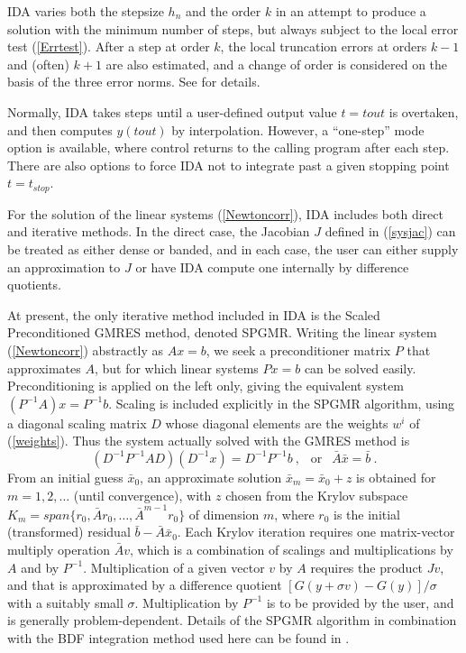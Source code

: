 \documentclass[11pt]{article}
\begin{document}
IDA varies both the stepsize $h_n$ and the order $k$ in an attempt to
produce a solution with the minimum number of steps, but always
subject to the local error test (\ref{Errtest}).  After a step at
order $k$, the local truncation errors at orders $k-1$ and (often)
$k+1$ are also estimated, and a change of order is considered on the
basis of the three error norms.  See \cite{BrCaPe96} for details.  

Normally, IDA takes steps until a user-defined output value $t = tout$
is overtaken, and then computes $y(tout)$ by interpolation.  However,
a ``one-step'' mode option is available, where control returns to the
calling program after each step.  There are also options to force IDA
not to integrate past a given stopping point $t = t_{stop}$.

For the solution of the linear systems (\ref{Newtoncorr}), IDA includes
both direct and iterative methods.  In the direct case, the Jacobian
$J$ defined in (\ref{sysjac}) can be treated as either dense or banded,
and in each case, the user can either supply an approximation to $J$
or have IDA compute one internally by difference quotients.

At present, the only iterative method included in IDA is the Scaled
Preconditioned GMRES method, denoted SPGMR.  Writing the linear system
(\ref{Newtoncorr}) abstractly as $A x = b$, we seek a preconditioner
matrix $P$ that approximates $A$, but for which linear systems 
$Px = b$ can be solved easily.  Preconditioning is applied on the left
only, giving the equivalent system $(P^{-1} A ) x = P^{-1} b$.
Scaling is included explicitly in the SPGMR algorithm, using a
diagonal scaling matrix $D$ whose diagonal elements are the weights
$w^i$ of (\ref{weights}).  Thus the system actually solved with the
GMRES method is
\begin{equation}
(D^{-1} P^{-1} A D ) (D^{-1} x) = D^{-1} P^{-1} b ~,~~
       \mbox{ or }~~  \bar{A} \bar{x} = \bar{b} ~.     \label{translinsys}
\end{equation}
From an initial guess $\bar{x}_0$, an approximate solution 
$\bar{x}_m = \bar{x}_0 + z$ is obtained for $m = 1, 2, \ldots$ 
(until convergence), with $z$ chosen from the Krylov subspace
$K_m = span\{r_0, \bar{A}r_0, \ldots, \bar{A}^{m-1}r_0\}$ 
of dimension $m$, where $r_0$ is the initial (transformed) residual 
$\bar{b} - \bar{A} \bar{x}_0$.  Each Krylov iteration requires one
matrix-vector multiply operation $\bar{A} v$, which is a combination
of scalings and multiplications by $A$ and by $P^{-1}$.
Multiplication of a given vector $v$ by $A$ requires the product $Jv$,
and that is approximated by a difference quotient 
$[G(y+\sigma v) - G(y)]/\sigma$ with a suitably small $\sigma$.
Multiplication by $P^{-1}$ is to be provided by the user, and is
generally problem-dependent.  Details of the SPGMR algorithm in
combination with the BDF integration method used here can be found in
\cite{BrHiPe94}.
\end{document}
